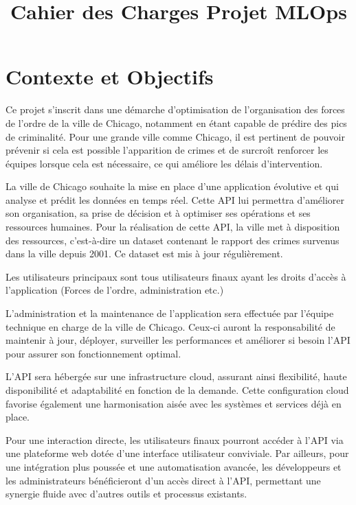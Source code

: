 \documentclass[12pt]{article}
\title{Cahier des Charges Projet MLOps}
\author{}
\date{}
\begin{document}
\maketitle

\section{Contexte et Objectifs}

Ce projet s’inscrit dans une démarche d’optimisation de l’organisation des forces de l’ordre de la ville de Chicago, notamment en étant capable de prédire des pics de criminalité. Pour une grande ville comme Chicago, il est pertinent de pouvoir prévenir si cela est possible l’apparition de crimes et de surcroît renforcer les équipes lorsque cela est nécessaire, ce qui améliore les délais d’intervention.

La ville de Chicago souhaite la mise en place d’une application évolutive et qui analyse et prédit les données en temps réel. Cette API lui permettra d’améliorer son organisation, sa prise de décision et à optimiser ses opérations et ses ressources humaines. Pour la réalisation de cette API, la ville met à disposition des ressources, c'est-à-dire un dataset contenant le rapport des crimes survenus dans la ville depuis 2001. Ce dataset est mis à jour régulièrement.

Les utilisateurs principaux sont tous utilisateurs finaux ayant les droits d’accès à l’application (Forces de l’ordre, administration etc.)

L’administration et la maintenance de l’application sera effectuée par l’équipe technique en charge de la ville de Chicago. Ceux-ci auront la responsabilité de maintenir à jour, déployer, surveiller les performances et améliorer si besoin l’API pour assurer son fonctionnement optimal.

L'API sera hébergée sur une infrastructure cloud, assurant ainsi flexibilité, haute disponibilité et adaptabilité en fonction de la demande. Cette configuration cloud favorise également une harmonisation aisée avec les systèmes et services déjà en place.

Pour une interaction directe, les utilisateurs finaux pourront accéder à l'API via une plateforme web dotée d'une interface utilisateur conviviale. Par ailleurs, pour une intégration plus poussée et une automatisation avancée, les développeurs et les administrateurs bénéficieront d'un accès direct à l’API, permettant une synergie fluide avec d'autres outils et processus existants.
\end{document}
